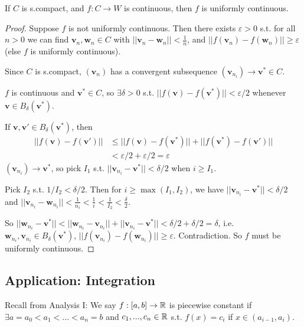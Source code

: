 \documentclass[a4paper]{article}
\begin{document}
\begin{thm}
If $C$ is s.compact, and $f:C \to W$ is continuous, then $f$ is uniformly continuous.
\begin{proof}
Suppose $f$ is not uniformly continuous. Then there exists $\varepsilon>0$ s.t. for all $n>0$ we can find $\mathbf{v}_n,\mathbf{w}_n\in C$ with $||\mathbf{v}_n-\mathbf{w}_n|| < \frac{1}{n}$, and $||f\left(\mathbf{v}_n\right)-f\left(\mathbf{w}_n\right)|| \geq \varepsilon$ (else $f$ is uniformly continuous).

Since $C$ is s.compact, $\left(\mathbf{v}_n\right)$ has a convergent subsequence $\left(\mathbf{v}_{n_i}\right) \to \mathbf{v^*} \in C$.

$f$ is continuous and $\mathbf{v}^* \in C$, so $\exists \delta > 0$ s.t. $||f\left(\mathbf{v}\right)-f\left(\mathbf{v^*}\right)|| < \varepsilon/2$ whenever $\mathbf{v}\in B_\delta\left(\mathbf{v^*}\right)$.

If $\mathbf{v},\mathbf{v'} \in B_\delta\left(\mathbf{v^*}\right)$, then
\begin{equation*}
\begin{aligned}
||f\left(\mathbf{v}\right) - f\left(\mathbf{v}'\right) || &\leq ||f\left(\mathbf{v}\right)-f\left(\mathbf{v}^*\right)|| + ||f\left(\mathbf{v}^*\right)-f\left(\mathbf{v}'\right)||\\ &< \varepsilon/2+\varepsilon/2 = \varepsilon
\end{aligned}
\end{equation*}
$\left(\mathbf{v}_{n_i}\right) \to \mathbf{v}^*$, so pick $I_1$ s.t. $||\mathbf{v}_{n_i} - \mathbf{v}^*|| < \delta/2$ when $i \geq I_1$.

Pick $I_2$ s.t. $1/I_2 < \delta/2$. Then for $i \geq \max\left(I_1,I_2\right)$, we have $||\mathbf{v}_{n_i} - \mathbf{v}^*|| < \delta/2$ and $||\mathbf{v}_{n_i} - \mathbf{w}_{n_i} || < \frac{1}{n_i} < \frac{1}{i} < \frac{1}{I_2} < \frac{\delta}{2}$.

So $||\mathbf{w}_{n_i} - \mathbf{v}^*|| < ||\mathbf{w}_{n_i} - \mathbf{v}_{n_i}|| + ||\mathbf{v}_{n_i} - \mathbf{v}^*|| < \delta/2+\delta/2 = \delta$, i.e. $\mathbf{w}_{n_i},\mathbf{v}_{n_i} \in B_\delta \left(\mathbf{v}^*\right)$, $||f\left(\mathbf{v}_{n_i}\right) - f\left(\mathbf{w}_{n_i}\right)|| \geq \varepsilon$. Contradiction. So $f$ must be uniformly continuous.
\end{proof}
\end{thm}

\subsection{Application: Integration}
Recall from Analysis I:
We say $f: \left[a,b\right] \to \mathbb{R}$ is piecewise constant if $\exists a=a_0<a_1<...<a_n=b$ and $c_1,...,c_n \in \mathbb{R}$ s.t. $f\left(x\right) = c_i$ if $x\in \left(a_{i-1},a_i\right)$.
\end{document}
